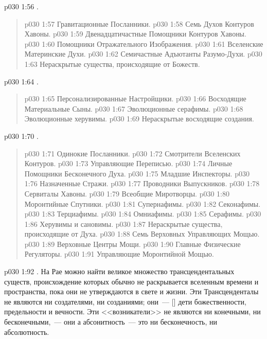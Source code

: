 \vs p030 1:56 .
\begin{quote}
\vs p030 1:57 Гравитационные Посланники.
\vs p030 1:58 Семь Духов Контуров Хавоны.
\vs p030 1:59 Двенадцатичастные Помощники Контуров Хавоны.
\vs p030 1:60 Помощники Отражательного Изображения.
\vs p030 1:61 Вселенские Материнские Духи.
\vs p030 1:62 Семичастные Адъютанты Разумо\hyp{}Духи.
\vs p030 1:63 Нераскрытые существа, происходящие от Божеств.
\end{quote}
\vs p030 1:64 .
\begin{quote}
\vs p030 1:65 Персонализированные Настройщики.
\vs p030 1:66 Восходящие Материальные Сыны.
\vs p030 1:67 Эволюционные серафимы.
\vs p030 1:68 Эволюционные херувимы.
\vs p030 1:69 Нераскрытые восходящие создания.
\end{quote}
\vs p030 1:70 .
\begin{quote}
\vs p030 1:71 Одинокие Посланники.
\vs p030 1:72 Смотрители Вселенских Контуров.
\vs p030 1:73 Управляющие Переписью.
\vs p030 1:74 Личные Помощники Бесконечного Духа.
\vs p030 1:75 Младшие Инспекторы.
\vs p030 1:76 Назначенные Стражи.
\vs p030 1:77 Проводники Выпускников.
\vs p030 1:78 Сервиталы Хавоны.
\vs p030 1:79 Всеобщие Миротворцы.
\vs p030 1:80 Моронтийные Спутники.
\vs p030 1:81 Супернафимы.
\vs p030 1:82 Секонафимы.
\vs p030 1:83 Терциафимы.
\vs p030 1:84 Омниафимы.
\vs p030 1:85 Серафимы.
\vs p030 1:86 Херувимы и сановимы.
\vs p030 1:87 Нераскрытые существа, происходящие от Духа.
\vs p030 1:88 Семь Верховных Управляющих Мощью.
\vs p030 1:89 Верховные Центры Мощи.
\vs p030 1:90 Главные Физические Регуляторы.
\vs p030 1:91 Управляющие Моронтийной Мощью.
\end{quote}
\vs p030 1:92 . На Рае можно найти великое множество трансцендентальных существ, происхождение которых обычно не раскрывается вселенным времени и пространства, пока они не утверждаются в свете и жизни. Эти Трансценденталы не являются ни создателями, ни созданиями; они~---  [] дети божественности, предельности и вечности. Эти <<возникатели>> не являются ни конечными, ни бесконечными,~--- они  а абсонитность~--- это ни бесконечность, ни абсолютность.
